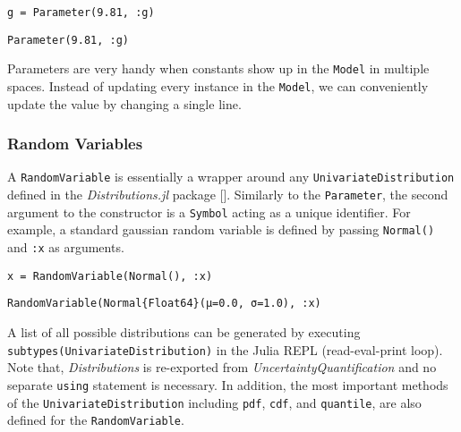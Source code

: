 \begin{verbatim}
g = Parameter(9.81, :g)
\end{verbatim}


\begin{verbatim}
Parameter(9.81, :g)
\end{verbatim}



Parameters are very handy when constants show up in the \texttt{Model} in multiple spaces. Instead of updating every instance in the \texttt{Model}, we can conveniently update the value by changing a single line.



\subsubsection{Random Variables}



\label{4893463912507967731}{}


A \texttt{RandomVariable} is essentially a wrapper around any \texttt{UnivariateDistribution} defined in the \emph{Distributions.jl} package []. Similarly to the \texttt{Parameter}, the second argument to the constructor is a \texttt{Symbol} acting as a unique identifier. For example, a standard gaussian random variable is defined by passing \texttt{Normal()} and \texttt{:x} as arguments.




\begin{verbatim}
x = RandomVariable(Normal(), :x)
\end{verbatim}


\begin{verbatim}
RandomVariable(Normal{Float64}(μ=0.0, σ=1.0), :x)
\end{verbatim}



A list of all possible distributions can be generated by executing \texttt{subtypes(UnivariateDistribution)} in the Julia REPL (read-eval-print loop). Note that, \emph{Distributions} is re-exported from \emph{UncertaintyQuantification} and no separate \texttt{using} statement is necessary. In addition, the most important methods of the \texttt{UnivariateDistribution} including \texttt{pdf}, \texttt{cdf}, and \texttt{quantile}, are also defined for the \texttt{RandomVariable}.



